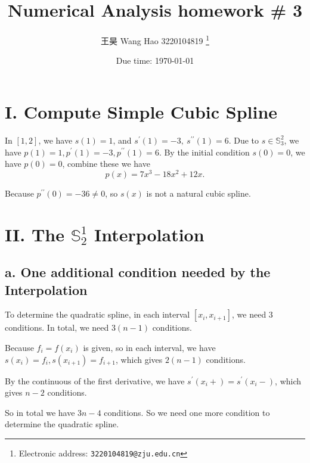 \documentclass[a4paper]{article}
\begin{document}
\title{Numerical Analysis homework \# 3}

\author{王昊 Wang Hao 3220104819
  \thanks{Electronic address: \texttt{3220104819@zju.edu.cn}}}


\date{Due time: \today}

\maketitle

\section*{I. Compute Simple Cubic Spline}

In $ [1,2] $, we have $ s(1) = 1 $, and $ s^{\prime}(1) = -3,~s ^{\prime \prime}(1)=6 $. Due to $ s \in \mathbb{S} _{3} ^{2} $, we have $ p(1) = 1, p ^{\prime}(1) = -3, p^{\prime \prime}(1) = 6 $. By the initial condition $ s(0) = 0 $, we have $ p(0) = 0 $, combine these we have
\begin{equation}
    p(x) = 7x ^{3} - 18x ^{2} + 12x. 
\end{equation}

Because $p ^{\prime \prime}(0) = -36 \ne 0$, so $ s(x) $ is not a natural cubic spline.


\section*{II. The $ \mathbb{S} _{2} ^{1} $ Interpolation}

\subsection*{a. One additional condition needed by the Interpolation}

To determine the quadratic spline, in each interval $ [x_{i}, x_{i+1}] $, we need 3 conditions. In total, we need $ 3(n-1) $ conditions.

Because $ f_i = f(x _{i})$ is given, so in each interval, we have $ s(x_i) = f_i, s(x _{i+1}) = f _{i+1} $, which gives $ 2(n-1) $ conditions.

By the continuous of the first derivative, we have $ s ^{\prime}(x_{i} + ) = s ^{\prime}(x_{i} -) $, which gives $ n-2 $ conditions.

So in total we have $ 3n-4 $ conditions. So we need one more condition to determine the quadratic spline.
\end{document}
